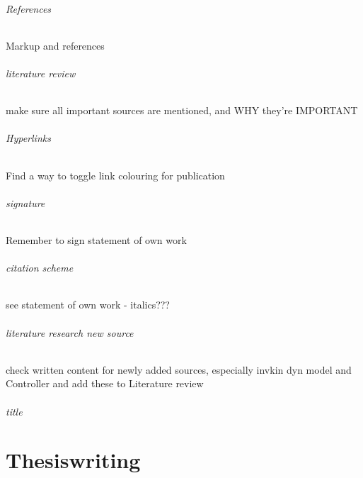 \paragraph{References}
Markup and references

\paragraph{literature review}
make sure all important sources are mentioned, and WHY they're IMPORTANT

\paragraph{Hyperlinks}
Find a way to toggle link colouring for publication

\paragraph{signature}
Remember to sign statement of own work

\paragraph{citation scheme}
see statement of own work - italics???

\paragraph{literature research new source}
check written content for newly added sources, especially invkin dyn model and Controller and add these to Literature review

\paragraph{title}


\cleardoublepage
\part{Thesiswriting}
\cleardoublepage